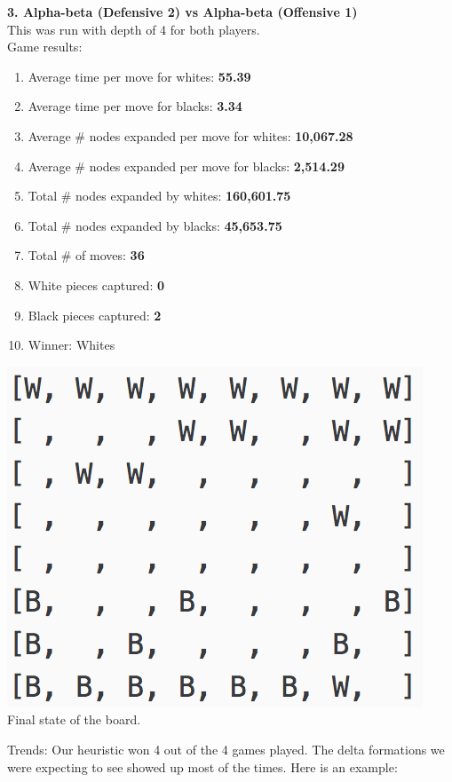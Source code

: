 \documentclass[11pt]{article}
\begin{document}
\pagebreak
\textbf{3. Alpha-beta (Defensive 2) vs Alpha-beta (Offensive 1)}\\
This was run with depth of 4 for both players.\\
Game results:\\
\begin{enumerate}
\item Average time per move for whites: \textbf{55.39}
\item Average time per move for blacks: \textbf{3.34}
\item Average \# nodes expanded per move for whites: \textbf{10,067.28}
\item Average \# nodes expanded per move for blacks:  \textbf{2,514.29}
\item Total \# nodes expanded by whites: \textbf{160,601.75}
\item Total \# nodes expanded by blacks: \textbf{45,653.75}
\item Total \# of moves: \textbf{36}
\item White pieces captured: \textbf{0}
\item Black pieces captured: \textbf{2}
\item Winner: Whites
\end{enumerate}
\begin{center}
\includegraphics[scale=1]{part2/ab-d2-vs-ab-o1.png}\\
Final state of the board.
\end{center}
Trends: Our heuristic won 4 out of the 4 games played. The delta formations we were expecting to see showed up most of the times. Here is an example: \\
\end{document}
